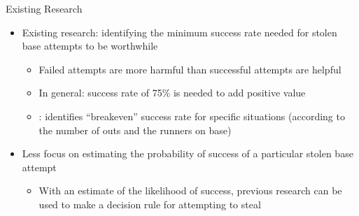 \documentclass[10pt]{beamer}
\begin{document}
\begin{frame}{Existing Research}
\begin{itemize}
    \item Existing research: identifying the minimum success rate needed for stolen base attempts to be worthwhile
    \begin{itemize}
        \item Failed attempts are more harmful than successful attempts are helpful
    
        \item In general: success rate of 75\% is needed to add positive value \citep{Stolen-Base-Percentage}

        \item \cite{keyes}: identifies ``breakeven'' success rate for specific situations (according to the number of outs and the runners on base)
    \end{itemize}
    \vspace{3mm}
    \item Less focus on estimating the probability of success of a particular stolen base attempt
    \begin{itemize}
        \item With an estimate of the likelihood of success, previous research can be used to make a decision rule for attempting to steal
    \end{itemize}
\end{itemize}
\end{frame}
\end{document}
